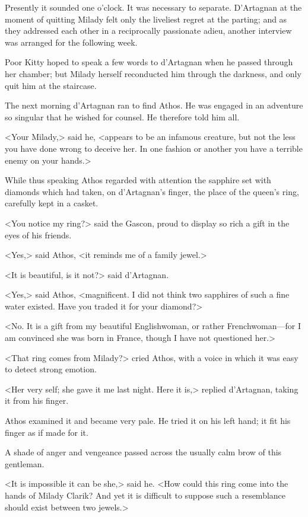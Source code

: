 Presently it sounded one o'clock. It was necessary to separate. D'Artagnan at the moment of quitting Milady felt only the liveliest regret at the parting; and as they addressed each other in a reciprocally passionate adieu, another interview was arranged for the following week. 

Poor Kitty hoped to speak a few words to d'Artagnan when he passed through her chamber; but Milady herself reconducted him through the darkness, and only quit him at the staircase. 

The next morning d'Artagnan ran to find Athos. He was engaged in an adventure so singular that he wished for counsel. He therefore told him all. 

<Your Milady,> said he, <appears to be an infamous creature, but not the less you have done wrong to deceive her. In one fashion or another you have a terrible enemy on your hands.> 

While thus speaking Athos regarded with attention the sapphire set with diamonds which had taken, on d'Artagnan's finger, the place of the queen's ring, carefully kept in a casket. 

<You notice my ring?> said the Gascon, proud to display so rich a gift in the eyes of his friends. 

<Yes,> said Athos, <it reminds me of a family jewel.> 

<It is beautiful, is it not?> said d'Artagnan. 

<Yes,> said Athos, <magnificent. I did not think two sapphires of such a fine water existed. Have you traded it for your diamond?> 

<No. It is a gift from my beautiful Englishwoman, or rather Frenchwoman---for I am convinced she was born in France, though I have not questioned her.> 

<That ring comes from Milady?> cried Athos, with a voice in which it was easy to detect strong emotion. 

<Her very self; she gave it me last night. Here it is,> replied d'Artagnan, taking it from his finger. 

Athos examined it and became very pale. He tried it on his left hand; it fit his finger as if made for it. 

A shade of anger and vengeance passed across the usually calm brow of this gentleman. 

<It is impossible it can be she,> said he. <How could this ring come into the hands of Milady Clarik? And yet it is difficult to suppose such a resemblance should exist between two jewels.> 

